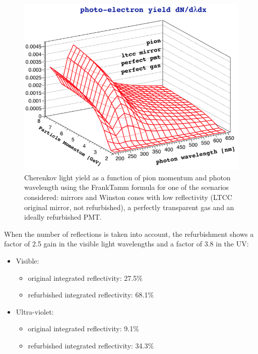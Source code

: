 \begin{figure}
	\centering
	\includegraphics[width=0.98\columnwidth, height=0.75\columnwidth]{img/photonYieldStudy.png}
	\caption{Cherenkov light yield as a function of pion momentum and photon wavelength using the Frank\textendash Tamm formula
             for one of the scenarios considered: mirrors and Winston cones with low reflectivity (LTCC original mirror, not refurbished),
             a perfectly transparent gas and an ideally refurbished PMT.}
	\label{fig:photonYieldStudy}
\end{figure}


When the number of reflections is taken into account, the refurbishment shows
a factor of 2.5 gain in the visible light wavelengths and a factor of 3.8 in the UV:

\begin{itemize}
	\item Visible:
	\begin{itemize}
		\item original integrated reflectivity: 27.5$\%$
		\item refurbished integrated reflectivity: 68.1$\%$
	\end{itemize}
	\item Ultra-violet:
	\begin{itemize}
		\item original integrated reflectivity: 9.1$\%$
		\item refurbished integrated reflectivity: 34.3$\%$
	\end{itemize}
\end{itemize}


